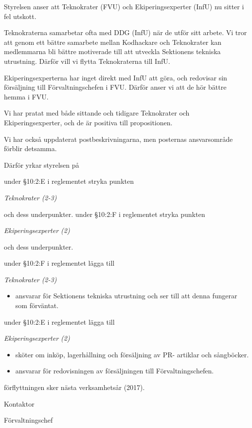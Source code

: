 \documentclass[../_main/handlingar.tex]{subfiles}
\begin{document}

Styrelsen anser att Teknokrater (FVU) och Ekiperingsexperter (InfU) nu sitter i fel utskott.

Teknokraterna samarbetar ofta med DDG (InfU) när de utför sitt arbete. Vi tror att genom ett bättre samarbete mellan Kodhackare och Teknokrater kan medlemmarna bli bättre motiverade till att utveckla Sektionens tekniska utrustning. Därför vill vi flytta Teknokraterna till InfU.

Ekiperingsexperterna har inget direkt med InfU att göra, och redovisar sin försäljning till Förvaltningschefen i FVU. Därför anser vi att de hör bättre hemma i FVU.

Vi har pratat med både sittande och tidigare Teknokrater och Ekiperingsexperter, och de är positiva till propositionen.

Vi har också uppdaterat postbeskrivningarna, men posternas ansvarsområde förblir detsamma.

Därför yrkar styrelsen på
\begin{attsatser}
    \att under \S10:2:E i reglementet stryka punkten\par
    {\it
    Teknokrater (2-3)
    }\par
    och dess underpunkter.
    \att under \S10:2:F i reglementet stryka punkten\par
    {\it
    Ekiperingsexperter (2)
    }\par
    och dess underpunkter.

    \att under \S10:2:F i reglementet lägga till\par
    {\it
    Teknokrater (2-3)
    \begin{itemize}[label={--}, topsep=0cm, noitemsep]
        \item ansvarar för Sektionens tekniska utrustning och ser till att denna fungerar som förväntat.
    \end{itemize}
    }

    \att under \S10:2:E i reglementet lägga till\par
    {\it
    Ekiperingsexperter (2)
    \begin{itemize}[label={--}, topsep=0cm, noitemsep]
        \item sköter om inköp, lagerhållning och försäljning av PR- artiklar och sångböcker.
        \item ansvarar för redovisningen av försäljningen till Förvaltningschefen.
    \end{itemize}
    }
    \att förflyttningen sker nästa verksamhetsår (2017).
\end{attsatser}

\begin{signatures}{2}
    \ist
    \signature{Erik Månsson}{Kontaktor}
    \signature{Anders Nilsson}{Förvaltningschef}
\end{signatures}
\end{document}
